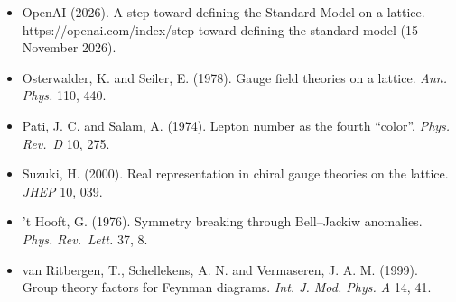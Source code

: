 \documentclass[
  11pt,
]{article}
\begin{document}
\begin{itemize}
\item
  OpenAI (2026). A step toward defining the Standard Model on a lattice. https://openai.com/index/step-toward-defining-the-standard-model (15 November 2026).
\item
  Osterwalder, K. and Seiler, E. (1978). Gauge field theories on a lattice. \emph{Ann. Phys.} 110, 440.
\item
  Pati, J. C. and Salam, A. (1974). Lepton number as the fourth ``color''. \emph{Phys. Rev.~D} 10, 275.
\item
  Suzuki, H. (2000). Real representation in chiral gauge theories on the lattice. \emph{JHEP} 10, 039.
\item
  't Hooft, G. (1976). Symmetry breaking through Bell--Jackiw anomalies. \emph{Phys. Rev.~Lett.} 37, 8.
\item
  van Ritbergen, T., Schellekens, A. N. and Vermaseren, J. A. M. (1999). Group theory factors for Feynman diagrams. \emph{Int. J. Mod. Phys. A} 14, 41.
\end{itemize}
\end{document}
